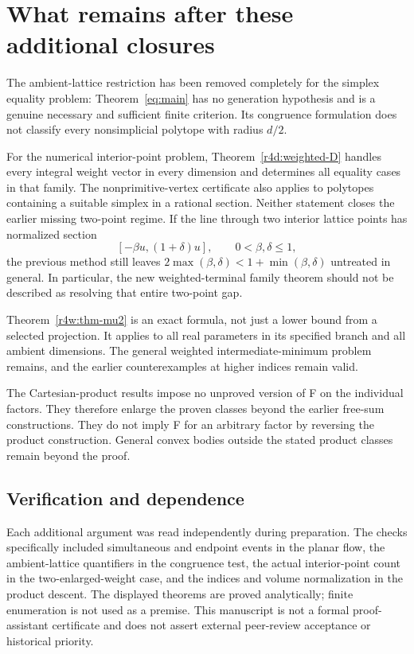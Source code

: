 \documentclass[11pt,a4paper]{article}
\theoremstyle{remark}\newtheorem{remark}[theorem]{Remark}
\begin{document}
\section{What remains after these additional closures}

The ambient-lattice restriction has been removed completely for the
simplex equality problem: Theorem~\ref{eq:main} has no generation
hypothesis and is a genuine necessary and sufficient finite criterion.
Its congruence formulation does not classify every nonsimplicial
polytope with radius $d/2$.

For the numerical interior-point problem, Theorem~\ref{r4d:weighted-D}
handles every integral weight vector in every dimension and determines
all equality cases in that family. The nonprimitive-vertex certificate
also applies to polytopes containing a suitable simplex in a rational
section. Neither statement closes the earlier missing two-point regime.
If the line through two interior lattice points has normalized section
\[
 [-\beta u,(1+\delta)u],\qquad 0<\beta,\delta\le1,
\]
the previous method still leaves
$2\max(\beta,\delta)<1+\min(\beta,\delta)$ untreated in general.
In particular, the new weighted-terminal family theorem should not be
described as resolving that entire two-point gap.

Theorem~\ref{r4w:thm-mu2} is an exact formula, not just a lower bound
from a selected projection. It applies to all real parameters in its
specified branch and all ambient dimensions. The general weighted
intermediate-minimum problem remains, and the earlier counterexamples
at higher indices remain valid.

The Cartesian-product results impose no unproved version of F on the
individual factors. They therefore enlarge the proven classes beyond
the earlier free-sum constructions. They do not imply F for an arbitrary
factor by reversing the product construction. General convex bodies
outside the stated product classes remain beyond the proof.

\subsection*{Verification and dependence}
Each additional argument was read independently during preparation.
The checks specifically included simultaneous and endpoint events in
the planar flow, the ambient-lattice quantifiers in the congruence test,
the actual interior-point count in the two-enlarged-weight case, and
the indices and volume normalization in the product descent.
The displayed theorems are proved analytically; finite enumeration is
not used as a premise. This manuscript is not a formal proof-assistant
certificate and does not assert external peer-review acceptance or
historical priority.
\end{document}
